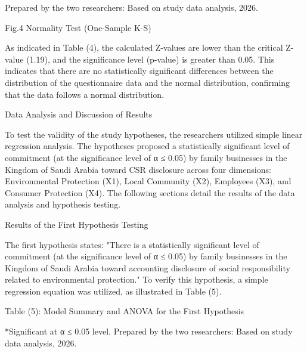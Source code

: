\documentclass{default}
\begin{document}
Prepared by the two researchers: Based on study data analysis, 2026.

Fig.4 Normality Test (One-Sample K-S)

As indicated in Table (4), the calculated Z-values are lower than the critical Z-value (1.19), and the significance level (p-value) is greater than 0.05. This indicates that there are no statistically significant differences between the distribution of the questionnaire data and the normal distribution, confirming that the data follows a normal distribution.

Data Analysis and Discussion of Results

To test the validity of the study hypotheses, the researchers utilized simple linear regression analysis. The hypotheses proposed a statistically significant level of commitment (at the significance level of α ≤ 0.05) by family businesses in the Kingdom of Saudi Arabia toward CSR disclosure across four dimensions: Environmental Protection (X1), Local Community (X2), Employees (X3), and Consumer Protection (X4). The following sections detail the results of the data analysis and hypothesis testing.

Results of the First Hypothesis Testing

The first hypothesis states: "There is a statistically significant level of commitment (at the significance level of α ≤ 0.05) by family businesses in the Kingdom of Saudi Arabia toward accounting disclosure of social responsibility related to environmental protection." To verify this hypothesis, a simple regression equation was utilized, as illustrated in Table (5).

Table (5): Model Summary and ANOVA for the First Hypothesis

\begin{table}[htbp]
\centering
{}
\caption{}

\end{table}

*Significant at α ≤ 0.05 level. Prepared by the two researchers: Based on study data analysis, 2026.
\end{document}
